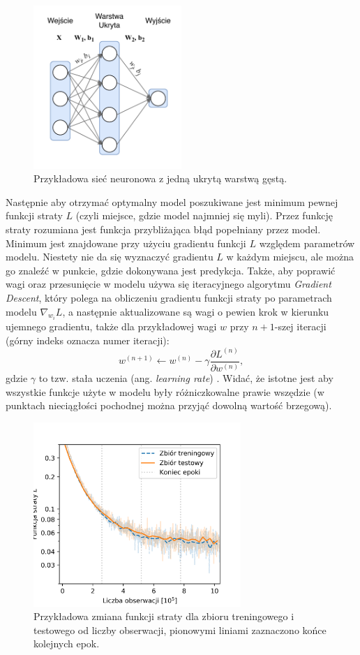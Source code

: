 \documentclass{pracalicmgr}
\begin{document}
	\begin{figure}[H]
	\centering
	\includegraphics[width=0.5\textwidth]{simple_nn.pdf}
	\caption{Przykładowa sieć neuronowa z jedną ukrytą warstwą gęstą.}
	\label{fig:simple}
	\end{figure}
	
	Następnie aby otrzymać optymalny model poszukiwane jest minimum pewnej funkcji straty $L$ (czyli miejsce, gdzie model najmniej się myli). Przez funkcję straty rozumiana jest funkcja przybliżająca błąd popełniany przez model. Minimum jest znajdowane przy użyciu gradientu funkcji $L$ względem parametrów modelu. Niestety nie da się wyznaczyć gradientu $L$ w każdym miejscu, ale można go znaleźć w punkcie, gdzie dokonywana jest predykcja. Także, aby poprawić wagi oraz przesunięcie w modelu używa się iteracyjnego algorytmu \textit{Gradient Descent}, który polega na obliczeniu gradientu funkcji straty po parametrach modelu $\nabla_{w_i}L$, a następnie aktualizowane są wagi o pewien krok w kierunku ujemnego gradientu, także dla przykładowej wagi $w$ przy $n+1$-szej iteracji (górny indeks oznacza numer iteracji): $$w^{(n+1)} \leftarrow w^{(n)} - \gamma \frac{\partial L^{(n)}}{\partial w^{(n)}},$$ gdzie $\gamma$ to tzw. stała uczenia (ang. \textit{learning rate}) \cite{dl}. Widać, że istotne jest aby wszystkie funkcje użyte w modelu były różniczkowalne prawie wszędzie (w punktach nieciągłości pochodnej można przyjąć dowolną wartość brzegową). 
	
	\begin{figure}
	\centering
	\includegraphics[width=0.7\textwidth]{loss_ensemble.png}
	\caption{Przykładowa zmiana funkcji straty dla zbioru treningowego i testowego od liczby obserwacji, pionowymi liniami zaznaczono końce kolejnych epok.}
	\label{fig:loss_example}
	\end{figure}	
	
\end{document}
